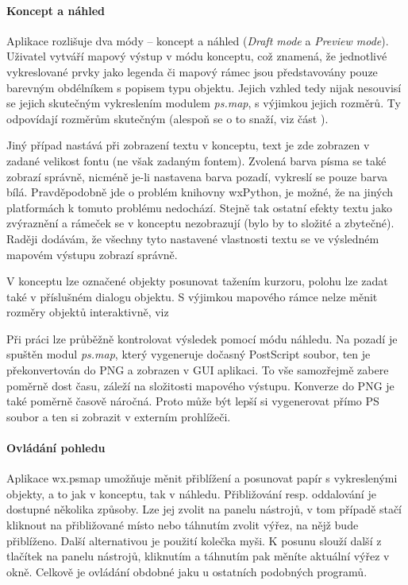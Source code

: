 \documentclass[a4paper,12pt,draft]{article}
\newcommand{\modul}[1]{\emph{#1}}
\begin{document}
\paragraph*{Koncept a náhled}
Aplikace rozlišuje dva módy -- koncept a náhled (\emph{Draft mode}
a \emph{Preview mode}).
Uživatel vytváří mapový výstup v módu konceptu, což znamená,
že jednotlivé vykreslované prvky jako legenda či mapový rámec jsou
představovány pouze barevným obdélníkem s popisem typu objektu. Jejich
vzhled tedy nijak nesouvisí se jejich skutečným vykreslením modulem
\modul{ps.map}, s výjimkou jejich rozměrů. Ty odpovídají rozměrům
skutečným (alespoň se o to snaží, viz část ).

Jiný případ nastává při zobrazení textu v konceptu, text je zde
zobrazen v zadané velikost fontu (ne však zadaným fontem). Zvolená
barva písma se také zobrazí správně, nicméně je-li nastavena barva
pozadí, vykreslí se pouze barva bílá. Pravděpodobně jde o problém
knihovny wxPython, je možné, že na jiných platformách k tomuto problému
nedochází. Stejně tak ostatní efekty textu jako zvýraznění a rámeček
se v konceptu nezobrazují (bylo by to složité a zbytečné). Raději
dodávám, že všechny tyto nastavené vlastnosti textu se ve výsledném
mapovém výstupu zobrazí správně.

V konceptu lze označené objekty posunovat tažením kurzoru, polohu lze
zadat také v příslušném dialogu objektu. S výjimkou mapového rámce
nelze měnit rozměry objektů interaktivně, viz 

Při práci lze průběžně kontrolovat výsledek pomocí módu náhledu. Na
pozadí je spuštěn modul \modul{ps.map}, který vygeneruje dočasný
PostScript soubor, ten je překonvertován do PNG a zobrazen v GUI
aplikaci. To vše samozřejmě zabere poměrně dost času, záleží na
složitosti mapového výstupu. Konverze do PNG je také poměrně časově
náročná. Proto může být lepší si vygenerovat přímo PS soubor a
ten si zobrazit v externím prohlížeči.

\paragraph*{Ovládání pohledu}
Aplikace wx.psmap umožňuje měnit přiblížení a posunovat papír s
vykreslenými objekty, a to jak v konceptu, tak v náhledu. Přibližování
resp. oddalování je dostupné několika způsoby. Lze jej zvolit na panelu
nástrojů, v tom případě stačí kliknout na přibližované místo nebo
táhnutím zvolit výřez, na nějž bude přiblíženo. Další alternativou
je použití kolečka myši. K posunu slouží další z tlačítek na
panelu nástrojů, kliknutím a táhnutím pak měníte aktuální výřez v
okně. Celkově je ovládání obdobné jaku u ostatních podobných programů.
\end{document}
